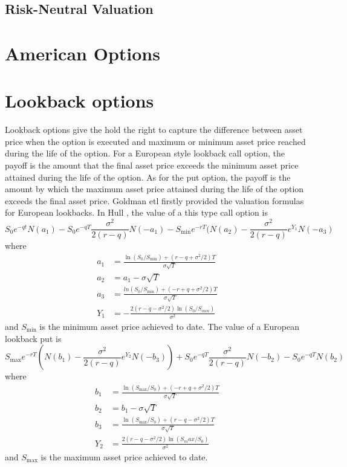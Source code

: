 \documentclass[11pt]{book}
\begin{document}

\subsection{Risk-Neutral Valuation}

\section{American Options}

\section{Lookback options}
Lookback options give the hold the right to capture the difference between asset price when the option is executed and maximum or minimum asset price reached during the life of the option. For a European style lookback call option, the payoff is the amount that the final asset price exceeds the minimum asset price attained during the life of the option. As for the put option, the payoff is the amount by which the maximum asset price attained during the life of the option exceeds the final asset price. Goldman etl firstly provided the valuation formulas for European lookbacks. In Hull \cite{Hull2008}, the value of a this type call option is
\begin{equation}\label{eq:3}
S_0e^{-qt}N(a_1) - S_0 e^{-qT}\frac{\sigma ^2}{2(r-q)} N(-a_1) - S_{\min} e^{-rT}(N(a_2) - \frac{\sigma^2}{2(r-q)} e ^{Y_1} N(-a_3)
\end{equation}
where
\begin{equation}\label{eq:4}
\begin{split}
a_1 &=\frac{\ln(S_0 / S_{\min}) + (r-q+\sigma^2 /2)T}{\sigma \sqrt{T}}\\
a_2 &= a_1 - \sigma \sqrt{T}\\
a_3 &= \frac{ln(S_0 / S_{\min})+ (-r+q+\sigma^2 / 2)T}{\sigma \sqrt{T}}\\
Y_1 &= - \frac{2(r-q-\sigma^2 / 2) \ln(S_0 / S_{min})}{\sigma^2}
\end{split}
\end{equation}
and $S_{\min}$ is the minimum asset price achieved to date.
The value of a European lookback put is
\begin{equation}\label{eq:5}
S_{\max} e^{-rT} ( N(b_1) - \frac{\sigma^2}{2(r-q)} e^{Y_2} N(-b_3)) + S_0 e^{-qT}\frac{\sigma^2}{2(r-q)} N(-b_2) - S_0 e^{-qT} N(b_2)
\end{equation}
where
\begin{equation}\label{eq:6}
\begin{split}
b_1 &= \frac{\ln(S_{\max} / S_0) + (-r + q + \sigma^2 /2)T}{\sigma \sqrt{T}}\\
b_2 &= b_1 - \sigma \sqrt{T}\\
b_3 &= \frac{\ln(S_{\max} / S_0) + (r-q-\sigma^2 /2)T}{\sigma \sqrt{T}}\\
Y_2 &= \frac{2(r-q-\sigma^2 / 2) \ln(S_max / S_0)}{\sigma^2}
\end{split}
\end{equation}
and $S_{\max}$ is the maximum asset price achieved to date.
\end{document}
